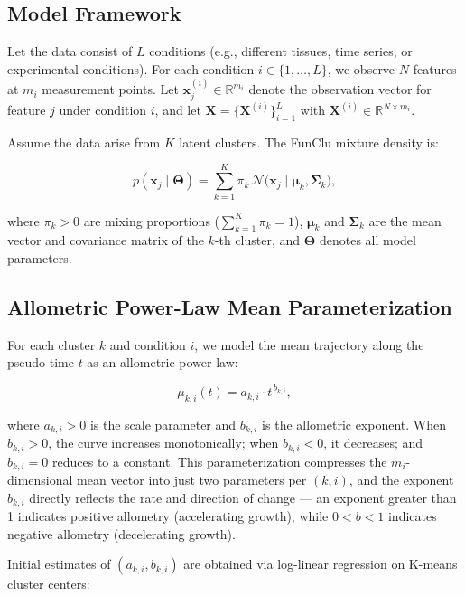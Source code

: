 \documentclass[12pt,a4paper]{article}
\begin{document}
\subsection{Model Framework}

Let the data consist of $L$ conditions (e.g., different tissues, time series, or experimental conditions). For each condition $i \in \{1, \dots, L\}$, we observe $N$ features at $m_i$ measurement points. Let $\bm{x}_j^{(i)} \in \mathbb{R}^{m_i}$ denote the observation vector for feature $j$ under condition $i$, and let $\bm{X} = \{\bm{X}^{(i)}\}_{i=1}^{L}$ with $\bm{X}^{(i)} \in \mathbb{R}^{N \times m_i}$.

Assume the data arise from $K$ latent clusters. The FunClu mixture density is:

\begin{equation}\label{eq:mixture}
    p(\bm{x}_j \mid \bm{\Theta}) = \sum_{k=1}^{K} \pi_k \,
        \mathcal{N}\bigl(\bm{x}_j \mid \bm{\mu}_k, \bm{\Sigma}_k\bigr),
\end{equation}

where $\pi_k > 0$ are mixing proportions ($\sum_{k=1}^{K} \pi_k = 1$), $\bm{\mu}_k$ and $\bm{\Sigma}_k$ are the mean vector and covariance matrix of the $k$-th cluster, and $\bm{\Theta}$ denotes all model parameters.

\subsection{Allometric Power-Law Mean Parameterization}

For each cluster $k$ and condition $i$, we model the mean trajectory along the pseudo-time $t$ as an allometric power law:

\begin{equation}\label{eq:power_mean}
    \mu_{k,i}(t) = a_{k,i} \cdot t^{\,b_{k,i}},
\end{equation}

where $a_{k,i} > 0$ is the scale parameter and $b_{k,i}$ is the allometric exponent. When $b_{k,i} > 0$, the curve increases monotonically; when $b_{k,i} < 0$, it decreases; and $b_{k,i} = 0$ reduces to a constant. This parameterization compresses the $m_i$-dimensional mean vector into just two parameters per $(k,i)$, and the exponent $b_{k,i}$ directly reflects the rate and direction of change --- an exponent greater than 1 indicates positive allometry (accelerating growth), while $0 < b < 1$ indicates negative allometry (decelerating growth).

Initial estimates of $(a_{k,i}, b_{k,i})$ are obtained via log-linear regression on K-means cluster centers:
\end{document}
